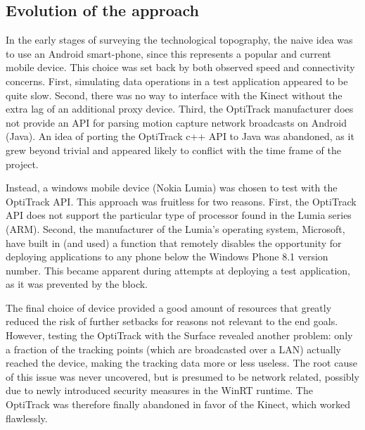 %
%


\subsection{Evolution of the approach}

In the early stages of surveying the technological topography, the naive idea was to use an Android smart-phone, since this represents a popular and current mobile device.  This choice was set back by both observed speed and connectivity concerns. First, simulating data operations in a test application appeared to be quite slow. Second, there was no way to interface with the Kinect without the extra lag of an additional proxy device. Third, the OptiTrack manufacturer does not provide an API for parsing motion capture network broadcasts on Android (Java). An idea of porting the OptiTrack c++ API to Java was abandoned, as it grew beyond trivial and appeared likely to conflict with the time frame of the project.

Instead, a windows mobile device (Nokia Lumia) was chosen to test with the OptiTrack API. This approach was fruitless for two reasons. First, the OptiTrack API does not support the particular type of processor found in the Lumia series (ARM). Second, the manufacturer of the Lumia's operating system, Microsoft, have built in (and used) a function that remotely disables the opportunity for deploying applications to any phone below the Windows Phone 8.1 version number. This became apparent during attempts at deploying a test application, as it was prevented by the block.

The final choice of device provided a good amount of resources that greatly reduced the risk of further setbacks for reasons not relevant to the end goals. However, testing the OptiTrack with the Surface revealed another problem: only a fraction of the tracking points (which are broadcasted over a LAN) actually reached the device, making the tracking data more or less useless. The root cause of this issue was never uncovered, but is presumed to be network related, possibly due to newly introduced security measures in the WinRT runtime. The OptiTrack was therefore finally abandoned in favor of the Kinect, which worked flawlessly.

